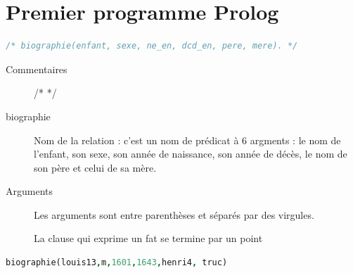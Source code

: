 \documentclass[12pt,a4paper,openany]{book}
\begin{document}
		\section{Premier programme Prolog}
		\begin{lstlisting}[language=Prolog]
/* biographie(enfant, sexe, ne_en, dcd_en, pere, mere). */
		\end{lstlisting}
	\begin{description}
		\item[Commentaires] /* */
		\item[biographie] Nom de la relation : c'est un nom de prédicat à 6 argments : le nom de l'enfant, son sexe, son année de naissance, son année
			de décès, le nom de son père et celui de sa mère.
		\item[Arguments] Les arguments sont entre parenthèses et séparés par des virgules.
		\item[]La clause qui exprime un fat se termine par un point 
	\end{description}
	\begin{exemple}
		\begin{lstlisting}[language=Prolog]
biographie(louis13,m,1601,1643,henri4, truc)
		\end{lstlisting}
	\end{exemple}
\end{document}
